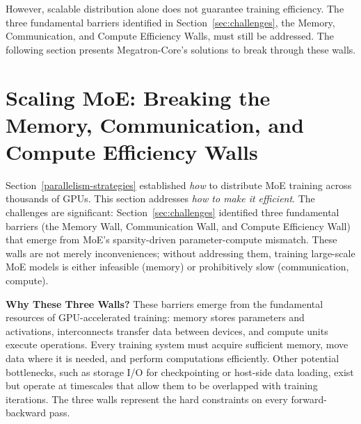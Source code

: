 \documentclass[10pt,logo,copyright]{nvidiatechreport}
\begin{document}
However, scalable distribution alone does not guarantee training efficiency. The three fundamental barriers identified in Section~\ref{sec:challenges}, the Memory, Communication, and Compute Efficiency Walls, must still be addressed. The following section presents Megatron-Core's solutions to break through these walls.

\section{Scaling MoE: Breaking the Memory, Communication, and Compute Efficiency Walls}\label{key-features-optimizations}

Section~\ref{parallelism-strategies} established \emph{how} to distribute MoE training across thousands of GPUs. This section addresses \emph{how to make it efficient}. The challenges are significant: Section~\ref{sec:challenges} identified three fundamental barriers (the Memory Wall, Communication Wall, and Compute Efficiency Wall) that emerge from MoE's sparsity-driven parameter-compute mismatch. These walls are not merely inconveniences; without addressing them, training large-scale MoE models is either infeasible (memory) or prohibitively slow (communication, compute).

\textbf{Why These Three Walls?} These barriers emerge from the fundamental resources of GPU-accelerated training: memory stores parameters and activations, interconnects transfer data between devices, and compute units execute operations. Every training system must acquire sufficient memory, move data where it is needed, and perform computations efficiently. Other potential bottlenecks, such as storage I/O for checkpointing or host-side data loading, exist but operate at timescales that allow them to be overlapped with training iterations. The three walls represent the hard constraints on every forward-backward pass.
\end{document}
